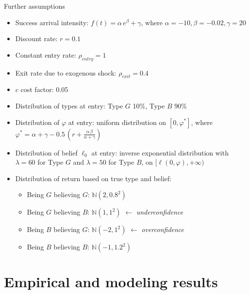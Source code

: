 \documentclass{beamer}
\begin{document}
\begin{frame}[allowframebreaks]{Further assumptions}
	\begin{itemize}
\item Success arrival intensity: $f(t)=\alpha \, e^\beta + \gamma$, where $\alpha = -10, \beta = -0.02, \gamma = 20$
\item Discount rate: $r = 0.1$
\item Constant entry rate: $\rho_{entry} = 1$
\item Exit rate due to exogenous shock: $\rho_{exit} = 0.4$
\item $c$ cost factor: 0.05
\end{itemize}

\framebreak

\begin{itemize}
\item Distribution of types at entry: Type $G$ 10\%, Type $B$ 90\%
\item Distribution of $\varphi$ at entry: uniform distribution on $[0, \varphi^*]$, where $\varphi^* = \alpha + \gamma - 0.5 \, (r + \frac{\alpha \, \beta}{\alpha + \gamma})$
\item Distribution of belief $\ell_0$ at entry: inverse exponential distribution with $\lambda = 60$ for Type $G$ and $\lambda = 50$ for Type $B$, on $[\ell(0, \varphi), +\infty)$
\item Distribution of return based on true type and belief:
\begin{itemize}
	\item Being $G$ believing $G$: $\mathbb N(2, 0.8^2)$
	\item Being $G$ believing $B$: $\mathbb N(1, 1^2)$
	$\leftarrow$ \textit{underconfidence}
	\item Being $B$ believing $G$: $\mathbb N(-2, 1^2)$
	$\leftarrow$ \textit{overconfidence}
	\item Being $B$ believing $B$: $\mathbb N(-1, 1.2^2)$
\end{itemize}
	\end{itemize}
\end{frame}



\section{Empirical and modeling results}
\end{document}
